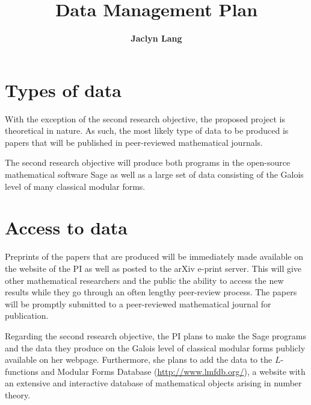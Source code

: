 \documentclass[11pt]{amsart}
\title{Data Management Plan}
\author{\textbf{Jaclyn Lang}}
\begin{document}
\maketitle

\section{Types of data}
With the exception of the second research objective, the proposed project is theoretical in nature.  As such, the most likely type of data to be produced is papers that will be published in peer-reviewed mathematical journals.

The second research objective will produce both programs in the open-source mathematical software Sage as well as a large set of data consisting of the Galois level of many classical modular forms.

\section{Access to data}
Preprints of the papers that are produced will be immediately made available on the website of the PI as well as posted to the arXiv e-print server.  This will give other mathematical researchers and the public the ability to access the new results while they go through an often lengthy peer-review process.  The papers will be promptly submitted to a peer-reviewed mathematical journal for publication.

Regarding the second research objective, the PI plans to make the Sage programs and the data they produce on the Galois level of classical modular forms publicly available on her webpage.  Furthermore, she plans to add the data to the $L$-functions and Modular Forms Database (\url{http://www.lmfdb.org/}), a website with an extensive and interactive database of mathematical objects arising in number theory.
\end{document}
